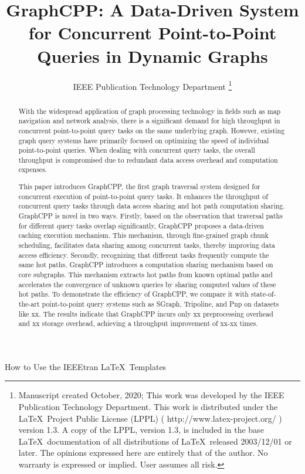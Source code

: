 \documentclass[lettersize,journal]{IEEEtran} %
\begin{document}
\title{GraphCPP: A Data-Driven System for Concurrent Point-to-Point Queries in Dynamic Graphs} %
\author{IEEE Publication Technology Department %
\thanks{Manuscript created October, 2020; This work was developed by the IEEE Publication Technology Department. This work is distributed under the \LaTeX \ Project Public License (LPPL) ( http://www.latex-project.org/ ) version 1.3. A copy of the LPPL, version 1.3, is included in the base \LaTeX \ documentation of all distributions of \LaTeX \ released 2003/12/01 or later. The opinions expressed here are entirely that of the author. No warranty is expressed or implied. User assumes all risk.}} %

{How to Use the IEEEtran \LaTeX \ Templates} 

\maketitle %

\begin{abstract} %
With the widespread application of graph processing technology in fields such as map navigation and network analysis, there is a significant demand for high throughput in concurrent point-to-point query tasks on the same underlying graph. However, existing graph query systems have primarily focused on optimizing the speed of individual point-to-point queries. When dealing with concurrent query tasks, the overall throughput is compromised due to redundant data access overhead and computation expenses.

This paper introduces GraphCPP, the first graph traversal system designed for concurrent execution of point-to-point query tasks. It enhances the throughput of concurrent query tasks through data access sharing and hot path computation sharing. GraphCPP is novel in two ways. Firstly, based on the observation that traversal paths for different query tasks overlap significantly, GraphCPP proposes a data-driven caching execution mechanism. This mechanism, through fine-grained graph chunk scheduling, facilitates data sharing among concurrent tasks, thereby improving data access efficiency. Secondly, recognizing that different tasks frequently compute the same hot paths, GraphCPP introduces a computation sharing mechanism based on core subgraphs. This mechanism extracts hot paths from known optimal paths and accelerates the convergence of unknown queries by sharing computed values of these hot paths. To demonstrate the efficiency of GraphCPP, we compare it with state-of-the-art point-to-point query systems such as SGraph, Tripoline, and Pnp on datasets like xx. The results indicate that GraphCPP incurs only xx preprocessing overhead and xx storage overhead, achieving a throughput improvement of xx-xx times.
  
\end{abstract}
\end{document}
